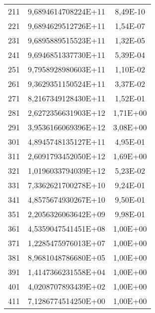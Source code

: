 \begin{table}[H]
\begin{threeparttable}
\begin{tabular}{c||c||c}
211 & 9,6894614708224E+11 & 8,49E-10 \\
221 & 9,6894629512726E+11 & 1,54E-07 \\
231 & 9,6895889515523E+11 & 1,32E-05 \\
241 & 9,6946851337730E+11 & 5,39E-04 \\
251 & 9,7958928980603E+11 & 1,10E-02 \\
261 & 9,3629351150524E+11 & 3,37E-02 \\
271 & 8,2167349128430E+11 & 1,52E-01 \\
281 & 2,6272356631903E+12 & 1,71E+00 \\
291 & 3,9536166069396E+12 & 3,08E+00 \\
301 & 4,8945748135127E+11 & 4,95E-01 \\
311 & 2,6091793452050E+12 & 1,69E+00 \\
321 & 1,0196033794039E+12 & 5,23E-02 \\
331 & 7,3362621700278E+10 & 9,24E-01 \\
341 & 4,8575674930267E+10 & 9,50E-01 \\
351 & 2,2056326063642E+09 & 9,98E-01 \\
361 & 4,5359047541451E+08 & 1,00E+00 \\
371 & 1,2285475976013E+07 & 1,00E+00 \\
381 & 8,9681048786680E+05 & 1,00E+00 \\
391 & 1,4147366231558E+04 & 1,00E+00 \\
401 & 4,0208707893439E+02 & 1,00E+00 \\
411 & 7,1286774514250E+00 & 1,00E+00
		\end{tabular}
	\end{threeparttable}
	\label{tab:norm:abstand_2}
\end{table}
%